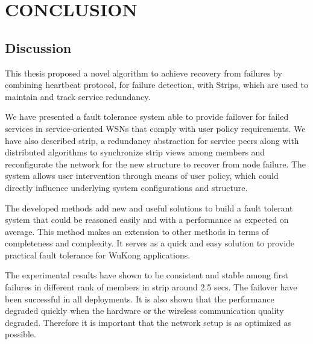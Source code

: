 \cleardoublepage
\singlespacing
\chapter{CONCLUSION}
\label{c:conclusion}
\doublespacing\nointerlineskip


\section{Discussion}

This thesis proposed a novel algorithm to achieve
recovery from failures by combining heartbeat protocol, for failure detection,
with Strips, which are used to maintain and track service redundancy.

We have presented a fault tolerance system able to provide failover for failed
services in service-oriented WSNs that comply with user policy requirements. We
have also described strip, a redundancy abstraction for service peers along with
distributed algorithms to synchronize strip views among members and
reconfigurate the network for the new structure to recover from node failure.
The system allows user intervention through means of user policy, which could
directly influence underlying system configurations and structure.

The developed methods add new and useful solutions to build a fault tolerant
system that could be reasoned easily and with a performance as expected on
average. This method makes an extension to other methods in terms of
completeness and complexity. It serves as a quick and easy solution
to provide practical fault tolerance for WuKong applications.


The experimental results have shown to be consistent and stable among first
failures in different rank of members in strip around 2.5 secs. The failover
have been successful in all deployments. It is also shown that the performance
degraded quickly when the hardware or the wireless communication quality
degraded. Therefore it is important that the network setup is as optimized as
possible. 

